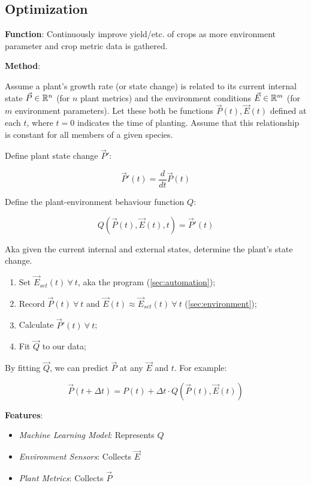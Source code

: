 \documentclass{report}
\begin{document}
\newpage

\subsection{Optimization}
\label{sec:optimization}

\textbf{Function}: Continuously improve yield/etc. of crops as more environment parameter and crop metric data is gathered.

\textbf{Method}: 

Assume a plant's growth rate (or state change) is related to its current internal state $\vec P \in \mathbb R^n$ (for $n$ plant metrics) and the environment conditions $\vec E \in \mathbb R^m$ (for $m$ environment parameters). Let these both be functions $\vec P (t),\vec E(t)$ defined at each $t$, where $t=0$ indicates the time of planting. Assume that this relationship is constant for all members of a given species.

Define plant state change $\vec P'$: 

$$\vec P'(t) = \frac{d}{dt}\vec P(t)$$

Define the plant-environment behaviour function $Q$: 

$$Q(\vec P(t), \vec E(t), t)=\vec P'(t)$$ 

Aka given the current internal and external states, determine the plant's state change.

\begin{enumerate}
    \item Set $\vec E_{set}(t)~\forall~ t$, aka the program (\ref{sec:automation});
    \item Record $\vec P(t)~\forall~ t$ and $\vec E(t)\approx \vec E_{set}(t)~\forall~ t$ (\ref{sec:environment});
    \item Calculate $\vec P'(t)~\forall~ t$;
    \item Fit $\vec Q$ to our data;
\end{enumerate}

By fitting $\vec Q$, we can predict $\vec P$ at any $\vec E$ and $t$. For example:

$$\vec P(t+\Delta t)=P(t)+\Delta t\cdot Q(\vec P(t),\vec E(t))$$

\textbf{Features}:
\begin{itemize}
    \item \textit{Machine Learning Model}: Represents $Q$
    \item \textit{Environment Sensors}: Collects $\vec E$
    \item \textit{Plant Metrics}: Collects $\vec P$
\end{itemize}
\end{document}
